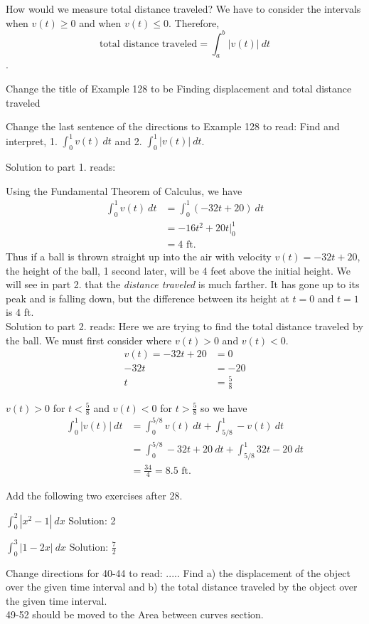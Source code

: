 \documentclass[10pt]{article}
\newcommand{\ds}{\displaystyle}
\begin{document}
 


How would we measure total distance traveled? We have to consider the intervals when $v(t)\geq 0$ and when $v(t)\leq 0$. Therefore, $$\text{total distance traveled}=\int_a^b |v(t)| ~dt$$.

Change the title of Example 128 to be Finding displacement and total distance traveled

Change the last sentence of the directions to Example 128 to read:  Find and interpret, 1. $\ds \int_0^1 v(t) ~dt$ and 2. $\ds\int_ 0^1 |v(t)| ~dt$.

Solution to part 1. reads:

{Using the Fundamental Theorem of Calculus, we have 
\begin{align*}
\int_0^1 v(t)\ dt &= \int_0^1 (-32t+20)\ dt \\
			&= -16t^2 + 20t\Big|_0^1 \\
			&= 4 \text{\ ft}.
\end{align*}
Thus if a ball is thrown straight up into the air with velocity $v(t) = -32t+20$, the height of the ball, 1 second later, will be 4 feet above the initial height. We will see in part 2. that the \textit{distance traveled} is much farther. It has gone up to its peak and is falling down, but the difference between its height at $t=0$ and $t=1$ is 4 ft.}\\

Solution to part 2. reads: Here we are trying to find the total distance traveled by the ball. We must first consider where $v(t)>0$ and $v(t)<0$.  
\begin{align*}
v(t)=-32t+20&=0\\
-32t&=-20\\
t&=\frac{5}{8}
\end{align*}

$v(t)>0$ for $t<\frac{5}{8}$ and $v(t)<0$ for $t>\frac{5}{8}$ so we have 
\begin{align*}
\int_0^1 |v(t)|~dt&=\int_0^{5/8} v(t)~dt + \int_{5/8}^1 -v(t)~dt\\
&=\int_0^{5/8} -32t+20~dt + \int_{5/8}^1 32t-20 ~dt\\
&=\frac{34}{4}=8.5 \text{\ ft}.
\end{align*}

Add the following two exercises after 28.

$\ds \int_0^2 |x^2-1|~dx$   Solution: 2

$\ds \int_0^3|1-2x|~dx$  Solution:  $\frac{7}{2}$

Change directions for 40-44 to read:  ..... Find a) the displacement of the object over the given time interval and b) the total distance traveled by the object over the given time interval. \\


49-52 should be moved to the Area between curves section.
\end{document}
